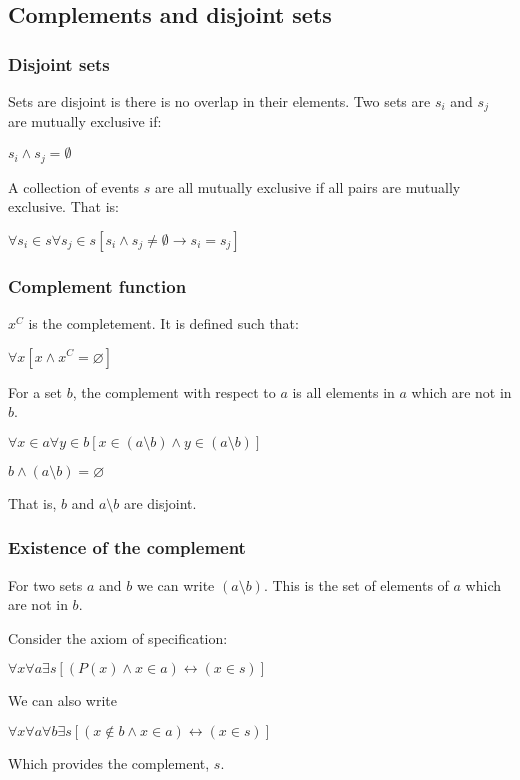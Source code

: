 
\subsection{Complements and disjoint sets}

\subsubsection{Disjoint sets}

Sets are disjoint is there is no overlap in their elements. Two sets are \(s_i\) and \(s_j\) are mutually exclusive if:

\(s_i\land s_j=\emptyset\)

A collection of events \(s\) are all mutually exclusive if all pairs are mutually exclusive. That is:

\(\forall s_i \in s\forall s_j\in s[s_i\land s_j\ne \emptyset \rightarrow s_i=s_j]\)

\subsubsection{Complement function}

\(x^C\) is the completement. It is defined such that:

$\forall x [x\land x^C=\varnothing ]$

For a set \(b\), the complement with respect to \(a\) is all elements in \(a\) which are not in \(b\).

\(\forall x \in a \forall y \in b [x \in (a \setminus b) \land y\in (a \setminus b)]\)

\(b\land (a \setminus b)= \varnothing \)

That is, \(b\) and \(a \setminus b\) are disjoint.

\subsubsection{Existence of the complement}

For two sets \(a\) and \(b\) we can write \((a \setminus b)\). This is the set of elements of \(a\) which are not in \(b\).

Consider the axiom of specification:

$\forall x \forall a \exists s[(P(x)\land x\in a )\leftrightarrow (x\in s)]$

We can also write

$\forall x \forall a \forall b\exists s[(x\not\in b\land x\in a )\leftrightarrow (x\in s)]$

Which provides the complement, \(s\).

